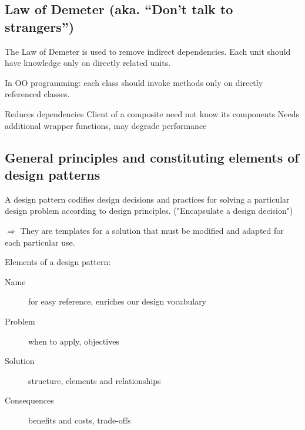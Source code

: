 \subsection{Law of Demeter (aka. \enquote{Don't talk to strangers})}

The Law of Demeter is used to remove indirect dependencies. Each unit
should have knowledge only on directly related units. \newline

In OO programming: each class should invoke methods only on directly
referenced classes.

\begin{itemize}
        \proitem{} Reduces dependencies
        \proitem{} Client of a composite need not know its components
        \consitem{} Needs additional wrapper functions, may degrade performance
\end{itemize}

\subsection{General principles and constituting elements of design patterns}

A design pattern codifies design decisions and practices for solving a
particular design problem according to design principles. ("Encapsulate
a design decision")

$\Rightarrow$  They are templates for a solution that must be modified and adapted for
each particular use. 
\newline

Elements of a design pattern:

\begin{description}
    \item[Name] for easy reference, enriches our design vocabulary
    \item[Problem] when to apply, objectives
    \item[Solution] structure, elements and relationships
    \item[Consequences] benefits and costs, trade-offs
\end{description}



